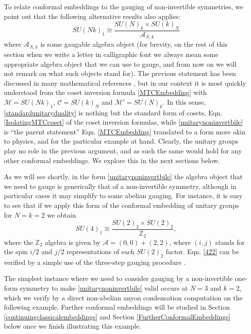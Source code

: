 \documentclass[11pt]{article}
\numberwithin{equation}{section}
\begin{document}
To relate conformal embeddings to the gauging of non-invertible symmetries, we point out that the following alternative results also applies:
\begin{equation} \label{unitarynoninvertbile}
    \boxed{SU(Nk)_{1} \cong \frac{SU(N)_{k} \times SU(k)_{N}}{\mathcal{A}_{N,k}}} 
\end{equation}
where $\mathcal{A}_{N,k}$ is some gaugable algebra object (for brevity, on the rest of this section when we write a letter in calligraphic font we always mean some appropriate algebra object that we can use to gauge, and from now on we will not remark on what such objects stand for). The previous statement has been discussed in many mathematical references \cite{Frohlich:2003hm, Davydov:2011pp,Huang:2005gs, Huang:2014ixa, kong2014anyon, davydov2013witt}, but in our context it is most quickly understood from the coset inversion formula \eqref{MTCEmbedding} with $\mathcal{M} = SU(Nk)_{1}$, $\mathcal{C} = SU(k)_{N}$ and $\mathcal{M}' = SU(N)_{k}$. In this sense, \eqref{standardunitaryduality} is nothing but the standard form of cosets, Eqn. \eqref{IsolatingMTCcoset} of the coset inversion formulas, while \eqref{unitarynoninvertbile} is ``the parent statement'' Eqn. \eqref{MTCEmbedding} translated to a form more akin to physics, and for the particular example at hand. Clearly, the unitary groups play no role in the previous argument, and as such the same would hold for any other conformal embeddings. We explore this in the next sections below.

As we will see shortly, in the form \eqref{unitarynoninvertbile} the algebra object that we need to gauge is generically that of a non-invertible symmetry, although in particular cases it may simplify to some abelian gauging. For instance, it is easy to see that if we apply this form of the conformal embedding of unitary groups for $N=k=2$ we obtain
\begin{equation} \label{422}
    SU(4)_{1} \cong \frac{SU(2)_{2} \times SU(2)_{2}}{\mathbb{Z}_{2}},
\end{equation}
where the $\mathbb{Z}_{2}$ algebra is given by $\mathcal{A} = (0,0) + (2,2)$, where $(i,j)$ stands for the spin $i/2$ and $j/2$ representations of each $SU(2)_{2}$ factor. Eqn. \eqref{422} can be verified by a simple use of the three-step gauging procedure \cite{Moore:1989yh}. 

The simplest instance where we need to consider gauging by a non-invertible one-form symmetry to make \eqref{unitarynoninvertbile} valid occurs at $N=3$ and $k=2$, which we verify by a direct non-abelian anyon condensation computation on the following example. Further conformal embeddings will be studied in Section \ref{continuingclassicalembeddings} and Section \ref{FurtherConformalEmbeddings} below once we finish illustrating this example.
\end{document}
